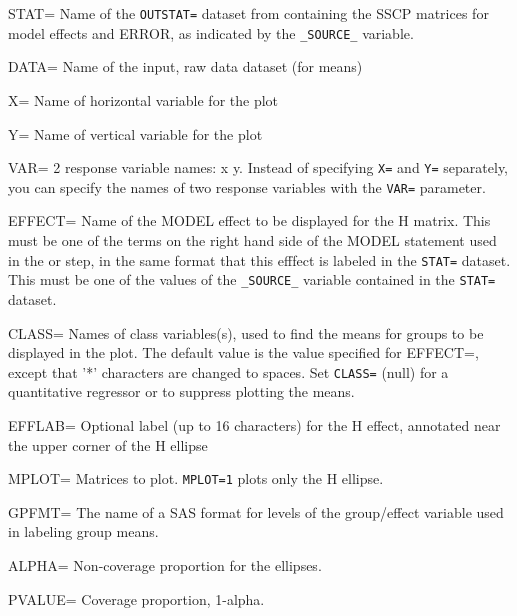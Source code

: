 \begin{proglist}

\item[STAT=] Name of the \texttt{OUTSTAT=} dataset from  containing the
SSCP matrices for model effects and ERROR, as indicated by
the \verb|_SOURCE_| variable.

\item[DATA=] Name of the input, raw data dataset (for means)

\item[X=] Name of horizontal variable for the plot

\item[Y=] Name of vertical variable for the plot

\item[VAR=] 2 response variable names: x y.  Instead of specifying \texttt{X=}
and \texttt{Y=} separately, you can specify the names of two response
variables with the \texttt{VAR=} parameter.

\item[EFFECT=] Name of the MODEL effect to be displayed for the H matrix.
This must be one of
the terms on the right hand side of the MODEL statement used
in the  or  step, in the same format that this
efffect is labeled in the \texttt{STAT=} dataset. This must be one of
the values of the \verb|_SOURCE_| variable contained in the \texttt{STAT=} 
dataset.

\item[CLASS=] Names of class variables(s), used to find the means for groups
to be displayed in the plot.  The default value is the value
specified for EFFECT=, except that '*' characters are changed
to spaces. Set \texttt{CLASS=} (null) for a quantitative regressor or to
suppress plotting the means.

\item[EFFLAB=] Optional label (up to 16 characters) for the H effect, annotated near the upper
corner of the H ellipse

\item[MPLOT=] Matrices to plot. \texttt{MPLOT=1} plots only the H ellipse. 

\item[GPFMT=] The name of a SAS format for levels of the group/effect variable used in labeling
group means.

\item[ALPHA=] Non-coverage proportion for the ellipses. 

\item[PVALUE=] Coverage proportion, 1-alpha. 


\end{proglist}
